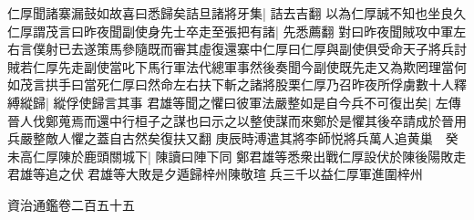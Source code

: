 仁厚聞諸寨漏鼓如故喜曰悉歸矣詰旦諸將牙集|{
	詰去吉翻}
以為仁厚誠不知也坐良久仁厚謂茂言曰昨夜聞副使身先士卒走至張把有諸|{
	先悉薦翻}
對曰昨夜聞賊攻中軍左右言僕射已去遂策馬參隨既而審其虛復還寨中仁厚曰仁厚與副使俱受命天子將兵討賊若仁厚先走副使當叱下馬行軍法代總軍事然後奏聞今副使既先走又為欺罔理當何如茂言拱手曰當死仁厚曰然命左右扶下斬之諸將股栗仁厚乃召昨夜所俘虜數十人釋縛縱歸|{
	縱俘使歸言其事}
君雄等聞之懼曰彼軍法嚴整如是自今兵不可復出矣|{
	左傳晉人伐鄭蒐焉而還中行桓子之謀也曰示之以整使謀而來鄭於是懼其後卒請成於晉用兵嚴整敵人懼之蓋自古然矣復扶又翻}
庚辰時溥遣其將李師悦將兵萬人追黄巢　癸未高仁厚陳於鹿頭關城下|{
	陳讀曰陣下同}
鄭君雄等悉衆出戰仁厚設伏於陳後陽敗走君雄等追之伏君雄等大敗是夕遁歸梓州陳敬瑄兵三千以益仁厚軍進圍梓州

資治通鑑卷二百五十五
